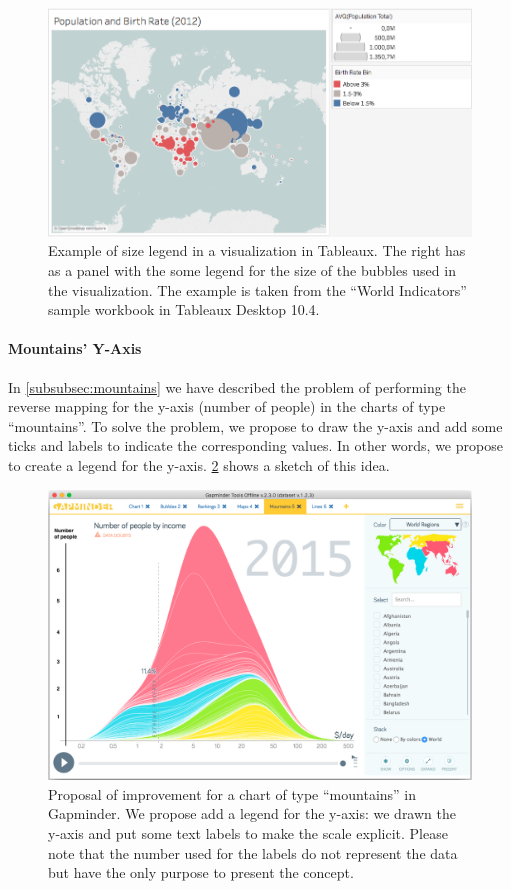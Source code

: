 \begin{figure}[h]
	\centering
	\includegraphics[width=0.95\columnwidth]{figures/size-legend}
	\caption{Example of size legend in a visualization in Tableaux. The right has as a panel with the some legend for the size of the bubbles used in the visualization. The example is taken from the ``World Indicators'' sample workbook in Tableaux Desktop 10.4.}
	\label{fig:size-legend}
\end{figure}

\paragraph{Mountains' Y-Axis}
In \cref{subsubsec:mountains} we have described the problem of performing the reverse mapping for the y-axis (number of people) in the charts of type ``mountains''.
To solve the problem, we propose to draw the y-axis and add some ticks and labels to indicate the corresponding values.
In other words, we propose to create a legend for the y-axis.
\cref{fig:mountains-y-legend} shows a sketch of this idea.

\begin{figure}[h]
	\centering
	\includegraphics[width=0.95\columnwidth]{figures/mountains-y-legend}
	\caption{Proposal of improvement for a chart of type ``mountains'' in Gapminder. We propose add a legend for the y-axis: we drawn the y-axis and put some text labels to make the scale explicit. Please note that the number used for the labels do not represent the data but have the only purpose to present the concept.}
	\label{fig:mountains-y-legend}
\end{figure}

